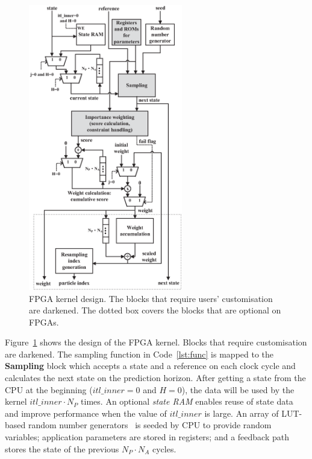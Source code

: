 \begin{figure}[t!]
\begin{center}
\includegraphics[width=0.6\textwidth]{design_flow/figures/kernel}
\end{center}
\caption{FPGA kernel design. The blocks that require users' customisation are darkened. The dotted box covers the blocks that are optional on FPGAs.}
\label{fig:kernel}
\end{figure}

Figure~\ref{fig:kernel} shows the design of the FPGA kernel. Blocks that require customisation are darkened.
The sampling function in Code~\ref{lst:func} is mapped to the \textbf{Sampling} block which accepts a state and a reference on each clock cycle and calculates the next state on the prediction horizon.
After getting a state from the CPU at the beginning ($itl\_inner=0$ and $H=0$), the data will be used by the kernel $itl\_inner \cdot N_P$ times.
An optional \textit{state RAM} enables reuse of state data and improve performance when the value of $itl\_inner$ is large.
An array of LUT-based random number generators~\cite{thomas07,thomas10} is seeded by CPU to provide random variables; application parameters are stored in registers; and
a feedback path stores the state of the previous $N_P \cdot N_A$ cycles.

